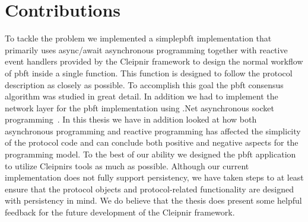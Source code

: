 \section{Contributions}

To tackle the problem we implemented a simple\ac{pbft} implementation that primarily uses async/await asynchronous programming together with reactive event handlers provided by the Cleipnir framework to design the normal workflow of \ac{pbft} inside a single function. This function is designed to follow the protocol description as closely as possible. To accomplish this goal the \ac{pbft} consensus algorithm was studied in great detail. In addition we had to implement the network layer for the \ac{pbft} implementation using .Net asynchronous socket programming~\cite{DOC:AsyncSocketProg, VIDEO:dotnetsocketprog}. In this thesis we have in addition looked at how both asynchronous programming and reactive programming has affected the simplicity of the protocol code and can conclude both positive and negative aspects for the programming model. To the best of our ability we designed the \ac{pbft} application to utilize Cleipnirs tools as much as possible. Although our current implementation does not fully support persistency, we have taken steps to at least ensure that the protocol objects and protocol-related functionality are designed with persistency in mind. We do believe that the thesis does present some helpful feedback for the future development of the Cleipnir framework.

